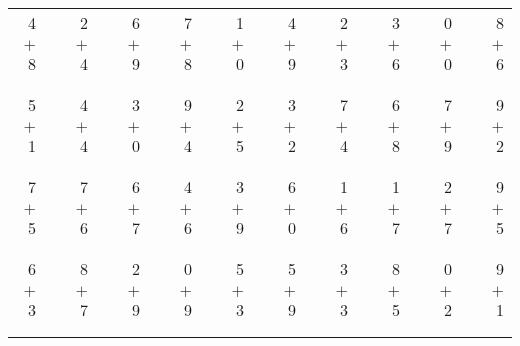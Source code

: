 \documentclass[12pt, letterpaper]{article}
\begin{document}
\begin{tabular}{rrrrrrrrrrrrrrrrrrr}
4 & & 2 & & 6 & & 7 & & 1 & & 4 & & 2 & & 3 & & 0 & & 8\\
$+$ 8 & & $+$ 4 & & $+$ 9 & & $+$ 8 & & $+$ 0 & & $+$ 9 & & $+$ 3 & & $+$ 6 & & $+$ 0 & & $+$ 6\\
\cline{1-1} \cline{3-3} \cline{5-5} \cline{7-7} \cline{9-9} \cline{11-11} \cline{13-13} \cline{15-15} \cline{17-17} \cline{19-19} \\ \\
5 & & 4 & & 3 & & 9 & & 2 & & 3 & & 7 & & 6 & & 7 & & 9\\
$+$ 1 & & $+$ 4 & & $+$ 0 & & $+$ 4 & & $+$ 5 & & $+$ 2 & & $+$ 4 & & $+$ 8 & & $+$ 9 & & $+$ 2\\
\cline{1-1} \cline{3-3} \cline{5-5} \cline{7-7} \cline{9-9} \cline{11-11} \cline{13-13} \cline{15-15} \cline{17-17} \cline{19-19} \\ \\
7 & & 7 & & 6 & & 4 & & 3 & & 6 & & 1 & & 1 & & 2 & & 9\\
$+$ 5 & & $+$ 6 & & $+$ 7 & & $+$ 6 & & $+$ 9 & & $+$ 0 & & $+$ 6 & & $+$ 7 & & $+$ 7 & & $+$ 5\\
\cline{1-1} \cline{3-3} \cline{5-5} \cline{7-7} \cline{9-9} \cline{11-11} \cline{13-13} \cline{15-15} \cline{17-17} \cline{19-19} \\ \\
6 & & 8 & & 2 & & 0 & & 5 & & 5 & & 3 & & 8 & & 0 & & 9\\
$+$ 3 & & $+$ 7 & & $+$ 9 & & $+$ 9 & & $+$ 3 & & $+$ 9 & & $+$ 3 & & $+$ 5 & & $+$ 2 & & $+$ 1\\
\cline{1-1} \cline{3-3} \cline{5-5} \cline{7-7} \cline{9-9} \cline{11-11} \cline{13-13} \cline{15-15} \cline{17-17} \cline{19-19} \\ \\
\end{tabular}
\newpage
\end{document}
